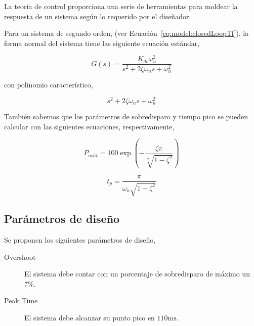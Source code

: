 \documentclass[12pt,a4paper]{article}
\begin{document}
        La teoría de control proporciona una serie de herramientas para moldear la respuesta de un sistema según 
        lo requerido por el diseñador. 

        Para un sistema de segundo orden, (ver Ecuación~\ref{eq:model:closedLoopTf}), la forma normal del sistema 
        tiene las siguiente ecuación estándar, 

        \begin{equation}
          G\left(s\right) = \frac{K_{dc}\omega_{n}^{2}}{s^{2} + 2\zeta\omega_{n}s + \omega_{n}^{2}}
          \label{eq:design:2ndorder_std}
        \end{equation}

        con polinomio característico, 

        \begin{equation}
          s^{2} + 2\zeta\omega_{n}s + \omega_{n}^{2}
          \label{eq:design:2ndorder_std_charact}
        \end{equation}

        También sabemos que los parámetros de sobredisparo y tiempo pico se pueden calcular con las siguientes ecuaciones, 
        respectivamente, 

        \begin{equation}
          P_{osht} = 100\exp\left(-\frac{\zeta\pi}{\sqrt[2]{1-\zeta^{2}}}\right)
          \label{eq:design:overshoot_prcntg}
        \end{equation}

        \begin{equation}
          t_{p} = \frac{\pi}{\omega_{n}\sqrt{1-\zeta^{2}}}
          \label{eq:design:peak_time}
        \end{equation}

      \subsection{Parámetros de diseño}

        Se proponen los siguientes parámetros de diseño,

        \begin{description}
          \item[Overshoot] El sistema debe contar con un porcentaje de sobredisparo de máximo un 7\%. 
          \item[Peak Time] El sistema debe alcanzar su punto pico en $ 110\si{\milli\second} $. 
        \end{description}
      
\end{document}
